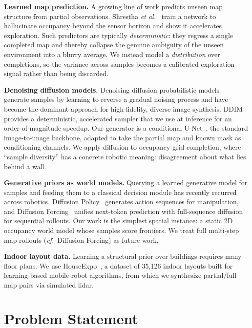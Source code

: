 \documentclass[conference]{IEEEtran}
\begin{document}
\textbf{Learned map prediction.} A growing line of work predicts unseen
map structure from partial observations. Shrestha \emph{et
al.}~\cite{shrestha2019} train a network to hallucinate occupancy
beyond the sensor horizon and show it accelerates exploration. Such
predictors are typically \emph{deterministic}: they regress a single
completed map and thereby collapse the genuine ambiguity of the unseen
environment into a blurry average. We instead model a
\emph{distribution} over completions, so the variance across samples
becomes a calibrated exploration signal rather than being discarded.

\textbf{Denoising diffusion models.} Denoising diffusion probabilistic
models~\cite{ho2020} generate samples by learning to reverse a gradual
noising process and have become the dominant approach for
high-fidelity, diverse image synthesis. DDIM~\cite{song2021} provides a
deterministic, accelerated sampler that we use at inference for an
order-of-magnitude speedup. Our generator is a conditional
U-Net~\cite{ronneberger2015}, the standard image-to-image backbone,
adapted to take the partial map and known mask as conditioning
channels. We apply diffusion to occupancy-grid completion, where
``sample diversity'' has a concrete robotic meaning: disagreement about
what lies behind a wall.

\textbf{Generative priors as world models.} Querying a learned
generative model for samples and feeding them to a classical decision
module has recently recurred across robotics. Diffusion
Policy~\cite{chi2023} generates action sequences for manipulation, and
Diffusion Forcing~\cite{chen2024} unifies next-token prediction with
full-sequence diffusion for sequential rollouts. Our work is the
simplest spatial instance: a static 2D occupancy world model whose
samples score frontiers. We treat full multi-step map rollouts
(\emph{cf.}\ Diffusion Forcing) as future work.

\textbf{Indoor layout data.} Learning a structural prior over buildings
requires many floor plans. We use HouseExpo~\cite{li2020houseexpo}, a
dataset of 35{,}126 indoor layouts built for learning-based
mobile-robot algorithms, from which we synthesize partial/full map
pairs via simulated lidar.

\section{Problem Statement}
\end{document}
